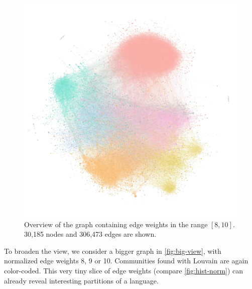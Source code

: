 \vspace{-1em}

\begin{figure}[H]
    \centering
    \includegraphics[width=0.9\linewidth, trim=1cm 4.8cm 0.5cm 3.2cm, clip]{assets/big view-min-min.jpg}
    \caption{Overview of the graph containing edge weights in the range $[8,10]$. 30,185 nodes and 306,473 edges are shown.}
    \label{fig:big-view}
\end{figure}

\vspace{-1.5em}

To broaden the view, we consider a bigger graph in \autoref{fig:big-view}, with normalized edge weights 8, 9 or 10. Communities found with Louvain are again color-coded. This very tiny slice of edge weights (compare \autoref{fig:hist-norm}) can already reveal interesting partitions of a language.

